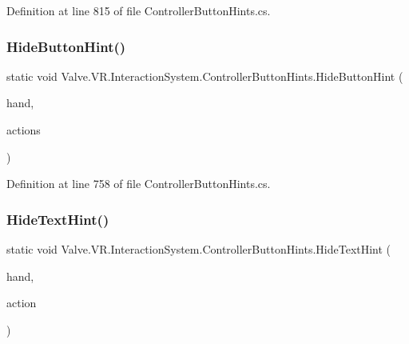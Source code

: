 Definition at line 815 of file Controller\+Button\+Hints.\+cs.

\mbox{\label{class_valve_1_1_v_r_1_1_interaction_system_1_1_controller_button_hints_a9251a64a30783b3698e77756b7c8015a}} 
\subsubsection{\texorpdfstring{HideButtonHint()}{HideButtonHint()}}
{\footnotesize\ttfamily static void Valve.\+V\+R.\+Interaction\+System.\+Controller\+Button\+Hints.\+Hide\+Button\+Hint (\begin{DoxyParamCaption}\item[{\mbox{\hyperlink{class_valve_1_1_v_r_1_1_interaction_system_1_1_hand}{Hand}}}]{hand,  }\item[{params \mbox{\hyperlink{interface_valve_1_1_v_r_1_1_i_steam_v_r___action___in___source}{I\+Steam\+V\+R\+\_\+\+Action\+\_\+\+In\+\_\+\+Source}} \mbox{[}$\,$\mbox{]}}]{actions }\end{DoxyParamCaption})\hspace{0.3cm}{\ttfamily [static]}}



Definition at line 758 of file Controller\+Button\+Hints.\+cs.

\mbox{\label{class_valve_1_1_v_r_1_1_interaction_system_1_1_controller_button_hints_a25bef79c295ed33b6ea4719007a9a7bc}} 
\subsubsection{\texorpdfstring{HideTextHint()}{HideTextHint()}}
{\footnotesize\ttfamily static void Valve.\+V\+R.\+Interaction\+System.\+Controller\+Button\+Hints.\+Hide\+Text\+Hint (\begin{DoxyParamCaption}\item[{\mbox{\hyperlink{class_valve_1_1_v_r_1_1_interaction_system_1_1_hand}{Hand}}}]{hand,  }\item[{\mbox{\hyperlink{interface_valve_1_1_v_r_1_1_i_steam_v_r___action___in___source}{I\+Steam\+V\+R\+\_\+\+Action\+\_\+\+In\+\_\+\+Source}}}]{action }\end{DoxyParamCaption})\hspace{0.3cm}{\ttfamily [static]}}



